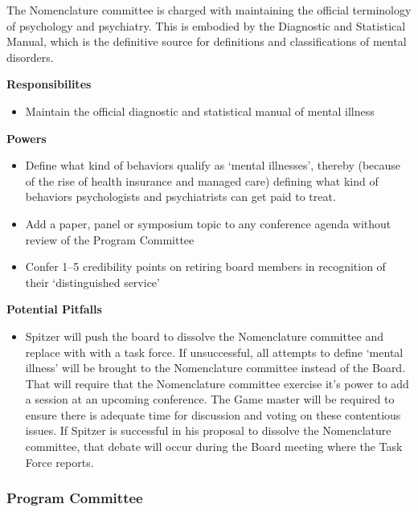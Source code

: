 \begin{refsection}
The Nomenclature committee is charged with maintaining the official terminology of psychology and psychiatry. This is embodied by the Diagnostic and Statistical Manual, which is the definitive source for definitions and classifications of mental disorders. 

\textbf{Responsibilites}

\begin{itemize}
\item Maintain the official diagnostic and statistical manual of mental illness

\end{itemize}

\textbf{Powers}

\begin{itemize}
\item Define what kind of behaviors qualify as ‘mental illnesses’, thereby (because of the rise of health insurance and managed care) defining what kind of behaviors psychologists and psychiatrists can get paid to treat.

\item Add a paper, panel or symposium topic to any conference agenda without review of the Program Committee

\item Confer 1--5 credibility points on retiring board members in recognition of their ‘distinguished service’

\end{itemize}

\textbf{Potential Pitfalls}

\begin{itemize}
\item Spitzer will push the board to dissolve the Nomenclature committee and replace with with a task force. If unsuccessful, all attempts to define ‘mental illness’ will be brought to the Nomenclature committee instead of the Board. That will require that the Nomenclature committee exercise it’s power to add a session at an upcoming conference. The Game master will be required to ensure there is adequate time for discussion and voting on these contentious issues. If Spitzer is successful in his proposal to dissolve the Nomenclature committee, that debate will occur during the Board meeting where the Task Force reports.

\end{itemize}

\subsubsection{Program Committee}
\label{programcommittee}


\end{refsection}

